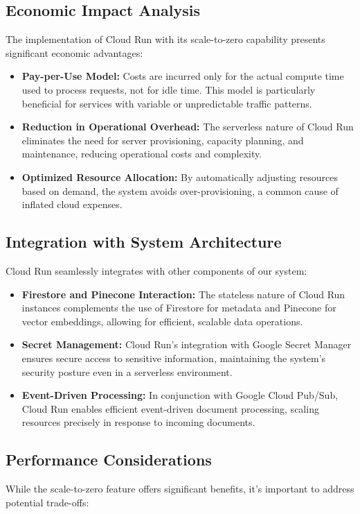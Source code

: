 \documentclass[a4paper, 12pt]{report}
\begin{document}
\subsection{Economic Impact Analysis}
The implementation of Cloud Run with its scale-to-zero capability presents significant economic advantages:

\begin{itemize}
    \item \textbf{Pay-per-Use Model:} Costs are incurred only for the actual compute time used to process requests, not for idle time. This model is particularly beneficial for services with variable or unpredictable traffic patterns.
    \item \textbf{Reduction in Operational Overhead:} The serverless nature of Cloud Run eliminates the need for server provisioning, capacity planning, and maintenance, reducing operational costs and complexity.
    \item \textbf{Optimized Resource Allocation:} By automatically adjusting resources based on demand, the system avoids over-provisioning, a common cause of inflated cloud expenses.
\end{itemize}

\subsection{Integration with System Architecture}
Cloud Run seamlessly integrates with other components of our system:

\begin{itemize}
    \item \textbf{Firestore and Pinecone Interaction:} The stateless nature of Cloud Run instances complements the use of Firestore for metadata and Pinecone for vector embeddings, allowing for efficient, scalable data operations.
    \item \textbf{Secret Management:} Cloud Run's integration with Google Secret Manager ensures secure access to sensitive information, maintaining the system's security posture even in a serverless environment.
    \item \textbf{Event-Driven Processing:} In conjunction with Google Cloud Pub/Sub, Cloud Run enables efficient event-driven document processing, scaling resources precisely in response to incoming documents.
\end{itemize}

\subsection{Performance Considerations}
While the scale-to-zero feature offers significant benefits, it's important to address potential trade-offs:
\end{document}
